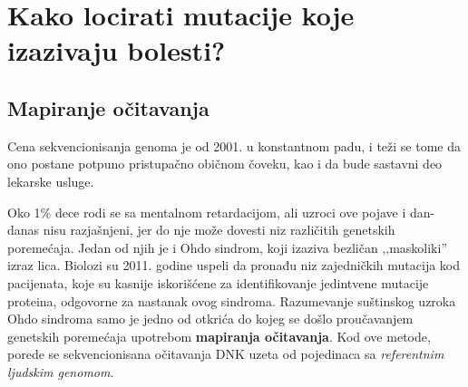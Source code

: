 \chapter {Kako locirati mutacije koje izazivaju bolesti?}
\setbookcodestyle

\section{Mapiranje očitavanja}

Cena sekvencionisanja genoma je od 2001. u konstantnom padu, i teži se tome da ono postane potpuno pristupačno običnom čoveku, kao i da bude sastavni deo lekarske usluge.

Oko 1\% dece rodi se sa mentalnom retardacijom, ali uzroci ove pojave i dan-danas nisu razjašnjeni, jer do nje može dovesti niz različitih genetskih poremećaja. Jedan od njih je i Ohdo sindrom, koji izaziva bezličan ,‚maskoliki'' izraz lica. 
Biolozi su 2011. godine uspeli da pronađu niz zajedničkih mutacija kod pacijenata, koje su kasnije iskorišćene za identifikovanje jedintvene mutacije proteina, odgovorne za nastanak ovog sindroma. Razumevanje suštinskog uzroka Ohdo sindroma samo je jedno od otkrića do kojeg se došlo proučavanjem genetskih poremećaja upotrebom \textbf{mapiranja očitavanja}. 
Kod ove metode, porede se sekvencionisana očitavanja DNK uzeta od pojedinaca sa \textit{referentnim ljudskim genomom}. 

